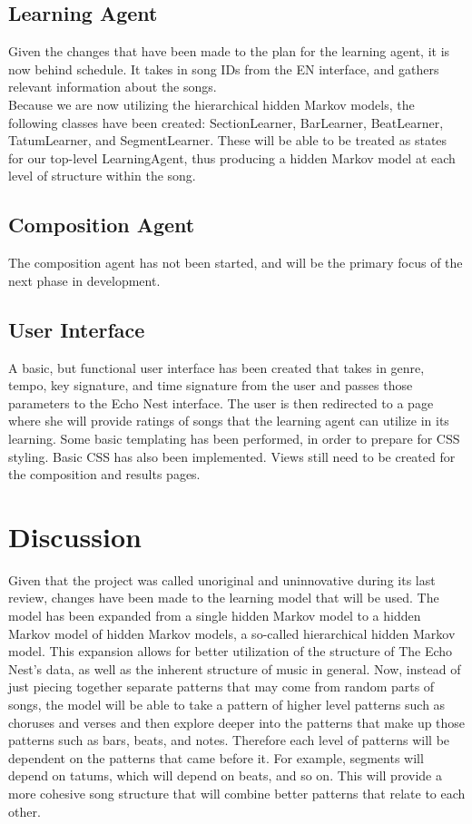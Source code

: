 \documentclass{article}
\begin{document}
\subsection{Learning Agent}
Given the changes that have been made to the plan for the learning agent, it is now behind schedule.
It takes in song IDs from the EN interface, and gathers relevant information about the songs.
\\
Because we are now utilizing the hierarchical hidden Markov models, the following classes have been created:
SectionLearner, BarLearner, BeatLearner, TatumLearner, and SegmentLearner. These will be able to be treated as
states for our top-level LearningAgent, thus producing a hidden Markov model at each level of structure within  
the song.

\subsection{Composition Agent}
The composition agent has not been started, and will be the primary focus of the next phase in development.

\subsection{User Interface}
A basic, but functional user interface has been created that takes in genre, tempo, key signature, and time
signature from the user and passes those parameters to the Echo Nest interface. The user is then redirected
to a page where she will provide ratings of songs that the learning agent can utilize in its learning. Some
basic templating has been performed, in order to prepare for CSS styling. Basic CSS has also been implemented. 
Views still need to be created for the composition and results pages.

\section{Discussion}
Given that the project was called unoriginal and uninnovative during its last review, changes have been 
made to the learning model that will be used. The model has been expanded from a single hidden Markov model to 
a hidden Markov model of hidden Markov models, a so-called hierarchical hidden Markov model. This expansion
allows for better utilization of the structure of The Echo Nest's data, as well as the inherent structure of
music in general. Now, instead of just piecing together separate patterns that may come from random parts of
songs, the model will be able to take a pattern of higher level patterns such as choruses and verses and then 
explore deeper into the patterns that make up those patterns such as bars, beats, and notes. Therefore each 
level of patterns will be dependent on the patterns that came before it. For example, segments will depend on 
tatums, which will depend on beats, and so on. This will provide a more cohesive song structure that will
combine better patterns that relate to each other.
\end{document}
